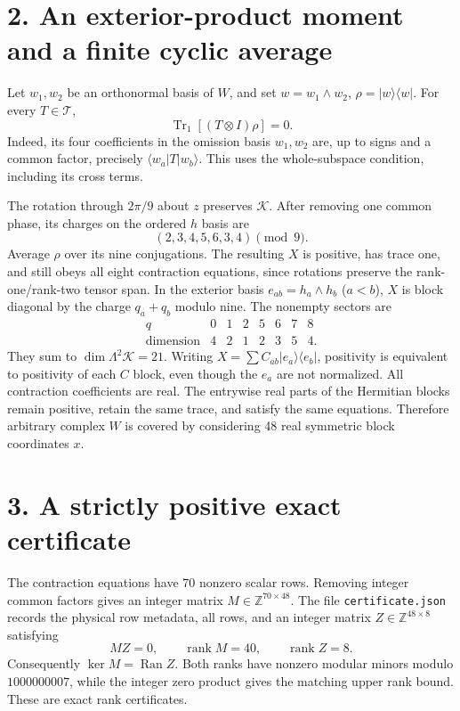 \documentclass[11pt]{article}
\newcommand{\Tr}{\operatorname{Tr}}
\begin{document}
\section*{2. An exterior-product moment and a finite cyclic average}
Let $w_1,w_2$ be an orthonormal basis of $W$, and set
$w=w_1\wedge w_2$, $\rho=|w\rangle\langle w|$.
For every $T\in\mathcal T$,
\[
 \Tr_1[(T\otimes I)\rho]=0.
\]
Indeed, its four coefficients in the omission basis $w_1,w_2$ are,
up to signs and a common factor, precisely
$\langle w_a|T|w_b\rangle$. This uses the whole-subspace condition,
including its cross terms.

The rotation through $2\pi/9$ about $z$ preserves $\mathcal K$.
After removing one common phase, its charges on the ordered $h$ basis are
\[
 (2,3,4,5,6,3,4)\pmod9.
\]
Average $\rho$ over its nine conjugations. The resulting $X$ is positive,
has trace one, and still obeys all eight contraction equations, since
rotations preserve the rank-one/rank-two tensor span. In the exterior basis
$e_{ab}=h_a\wedge h_b$ ($a<b$), $X$ is block diagonal by the charge
$q_a+q_b$ modulo nine. The nonempty sectors are
\[
\begin{array}{c|rrrrrrr}
q&0&1&2&5&6&7&8\\\hline
\text{dimension}&4&2&1&2&3&5&4.
\end{array}
\]
They sum to $\dim\Lambda^2\mathcal K=21$.
Writing $X=\sum C_{ab}|e_a\rangle\langle e_b|$, positivity is equivalent
to positivity of each $C$ block, even though the $e_a$ are not normalized.
All contraction coefficients are real. The entrywise real parts of the
Hermitian blocks remain positive, retain the same trace, and satisfy the
same equations. Therefore arbitrary complex $W$ is covered by considering
48 real symmetric block coordinates $x$.

\section*{3. A strictly positive exact certificate}
The contraction equations have 70 nonzero scalar rows. Removing integer
common factors gives an integer matrix $M\in\mathbb Z^{70\times48}$.
The file \texttt{certificate.json} records the physical row metadata,
all rows, and an integer matrix $Z\in\mathbb Z^{48\times8}$ satisfying
\[
 MZ=0,\qquad \operatorname{rank}M=40,\qquad\operatorname{rank}Z=8.
\]
Consequently $\ker M=\operatorname{Ran}Z$. Both ranks have nonzero
modular minors modulo $1000000007$, while the integer zero product gives
the matching upper rank bound. These are exact rank certificates.
\end{document}

